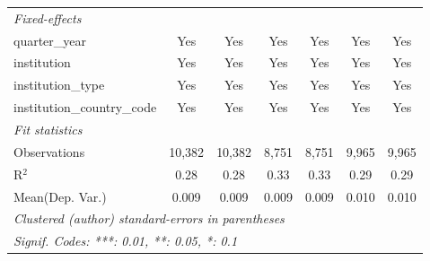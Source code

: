 \begin{tabular}{lcccccc}
   \midrule
   \emph{Fixed-effects}\\
   quarter\_year                      & Yes     & Yes        & Yes     & Yes       & Yes     & Yes\\  
   institution                        & Yes     & Yes        & Yes     & Yes       & Yes     & Yes\\  
   institution\_type                  & Yes     & Yes        & Yes     & Yes       & Yes     & Yes\\  
   institution\_country\_code         & Yes     & Yes        & Yes     & Yes       & Yes     & Yes\\  
   \midrule
   \emph{Fit statistics}\\
   Observations                       & 10,382  & 10,382     & 8,751   & 8,751     & 9,965   & 9,965\\  
   R$^2$                              & 0.28    & 0.28       & 0.33    & 0.33      & 0.29    & 0.29\\  
Mean(Dep. Var.) & 0.009 & 0.009 & 0.009 & 0.009 & 0.010 & 0.010 \\
   \midrule \midrule
   \multicolumn{7}{l}{\emph{Clustered (author) standard-errors in parentheses}}\\
   \multicolumn{7}{l}{\emph{Signif. Codes: ***: 0.01, **: 0.05, *: 0.1}}\\
\end{tabular}
\par\endgroup
